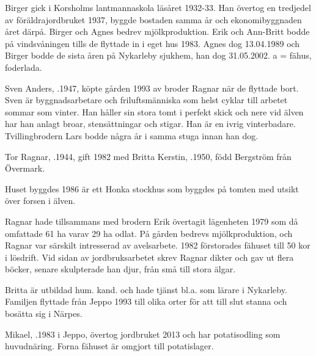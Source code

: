 Birger gick i Korsholms lantmannaskola läsåret 1932-33. Han övertog en tredjedel av föräldrajordbruket 1937, byggde bostaden samma år och ekonomibyggnaden året därpå. Birger och Agnes bedrev mjölkproduktion. Erik och Ann-Britt bodde på vindsvåningen tills de flyttade in i eget hus 1983. Agnes dog 13.04.1989 och Birger bodde de sista åren på Nykarleby sjukhem, han dog 31.05.2002. a = fähus, foderlada.






Sven Anders, .1947,  köpte gården 1993 av broder Ragnar när de flyttade bort. Sven är byggnadsarbetare och friluftsmänniska som helst cyklar till arbetet sommar som vinter. Han håller sin stora tomt i perfekt skick och nere vid älven har han anlagt broar, stensättningar och stigar. Han är en ivrig vinterbadare. Tvillingbrodern Lars bodde några år i samma stuga innan han dog.



Tor Ragnar, .1944, gift 1982 med Britta Kerstin, .1950, född Bergström från Övermark.
\begin{jhchildren}
  \item {}
  \item {}
\end{jhchildren}
Huset byggdes 1986 är ett Honka stockhus som byggdes på tomten med utsikt över forsen i älven.

Ragnar hade tillsammans med brodern Erik övertagit lägenheten 1979 som då omfattade 61 ha varav 29 ha odlat. På gården bedrevs mjölkproduktion, och Ragnar var särskilt intresserad av avelsarbete. 1982 förstorades fähuset till 50 kor i lösdrift. Vid sidan av jordbruksarbetet skrev Ragnar dikter och gav ut flera böcker, senare skulpterade han djur, från små till stora älgar.

Britta är utbildad hum. kand. och hade tjänst bl.a. som lärare i Nykarleby. Familjen flyttade från Jeppo 1993 till olika orter för att till slut stanna och bosätta sig i Närpes.





Mikael, .1983 i Jeppo, övertog jordbruket 2013 och har potatisodling som huvudnäring. Forna fähuset är omgjort till potatislager.\jhvspace{}


